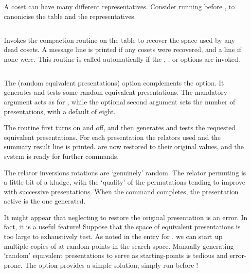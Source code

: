 A coset can have many different representatives.
Consider running  before , to canonicise the table and the
  representatives.

\subsection{}

Invokes the compaction routine on the table to recover the space used by
  any dead cosets.
A  message line is printed if any cosets were recovered, and a
   line if none were.
This routine is called automatically if the , , 
  or  options are invoked.

\subsection{}

The  (random equivalent presentations) option complements the
   option.
It generates and tests some random equivalent presentations.
The mandatory argument acts as for , while the optional second
  argument sets the number of presentations, with a default of eight.

The routine first turns  on and  off, and then 
  generates and tests the requested equivalent presentations.
For each presentation the relators used and the summary result line is
  printed.
 \amp {} are now restored to their original values, and 
  the system is ready for further commands.

The relator inversions \amp rotations are `genuinely' random.
The relator permuting is a little bit of a kludge, with the `quality' of
  the permutations tending to improve with successive presentations. 
When the  command completes, the presentation active is the 
   one generated.

It might appear that neglecting to restore the original presentation is an
  error.
In fact, it is a useful feature!
Suppose that the space of equivalent presentations is too large to
  exhaustively test.
As noted in the entry for , we can start up multiple copies of
   at random points in the search-space.
Manually generating `random' equivalent presentations to serve as
  starting-points is tedious and error-prone.
The  option provides a simple solution; simply run 
  before !

